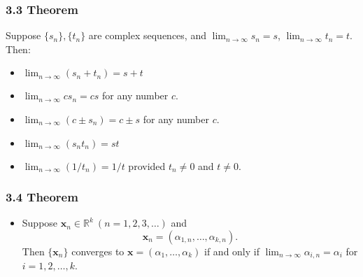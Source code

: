 \documentclass{beamer}
\begin{document}
\begin{frame}
    \frametitle{3.3 Theorem}

    Suppose \(\{s_n\},\{t_n\}\) are complex sequences, and \(\lim_{n\to \infty}s_n =s\), \(
    \lim_{n \to \infty}t_n =t\). Then: \pause 
    \begin{itemize}
        \item \(\lim_{n \to \infty} (s_n + t_n)=s +t\) \pause
        \item \(\lim_{n \to \infty} cs_n= cs\) for any number \(c\). \pause
        \item \(\lim_{n \to \infty} (c\pm s_n)= c \pm s\) for any number \(c\). \pause
        \item \(\lim_{n \to \infty} (s_n t_n) = st\) \pause
        \item \(\lim_{n \to \infty} (1/t_n) = 1/t\) provided \(t_n \ne 0\) and \(t \neq 0\).
    \end{itemize}

\end{frame}

\begin{frame}
    \frametitle{3.4 Theorem}

    \begin{itemize}
        \item Suppose \(\mathbf{x}_n \in \mathbb{R}^k~(n=1,2,3, \dots)\) and \[\mathbf{x}_n = (\alpha_{1,n}, \dots, \alpha_{k,n}).\] Then \(\{\mathbf{x}_n\}\) converges to \(\mathbf{x} = (\alpha_1, \dots, \alpha_k)\) if and only if \(\lim_{n \to \infty}\alpha_{i,n} = \alpha_i\) for \(i=1,2,\dots,k\). \pause 
    \end{itemize}

\end{frame}
\end{document}
